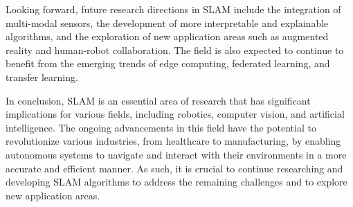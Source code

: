 \documentclass[conference]{IEEEtran}
\begin{document}
Looking forward, future research directions in SLAM include the integration of multi-modal sensors, the development of more interpretable and explainable algorithms, and the exploration of new application areas such as augmented reality and human-robot collaboration. The field is also expected to continue to benefit from the emerging trends of edge computing, federated learning, and transfer learning.

In conclusion, SLAM is an essential area of research that has significant implications for various fields, including robotics, computer vision, and artificial intelligence. The ongoing advancements in this field have the potential to revolutionize various industries, from healthcare to manufacturing, by enabling autonomous systems to navigate and interact with their environments in a more accurate and efficient manner. As such, it is crucial to continue researching and developing SLAM algorithms to address the remaining challenges and to explore new application areas.



\end{document}
